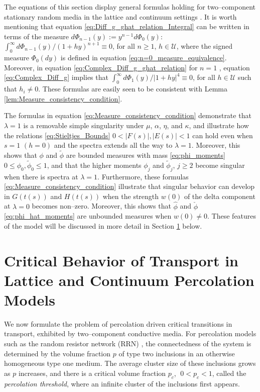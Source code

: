 \documentclass[english,12pt,jmp,graphicx]{revtex4-1}
\newcommand{\ph}{\hat{\phi}}
\begin{document}
The equations of this section display general formulas holding for
two--component stationary random media in the lattice and continuum
settings \cite{Golden:PRL-3935}. It is worth mentioning that equation
\eqref{eq:Diff_g_ghat_relation_Integral} can be written in terms of
the measure $d\Phi_{n-1}(y):=y^{n-1}d\Phi_0(y)$:
$\int_0^\infty d\Phi_{n-1}(y)/(1+hy)^{n+1}\equiv0$, for all $n\geq1$, $h\in\mathcal{U}$,
where the signed measure $\Phi_0(dy)$ is defined in equation
\eqref{eq:n=0_measure_equivalence}. Moreover, in equation 
\eqref{eq:Complex_Diff_g_ghat_relation} for $n=1$ , equation
\eqref{eq:Complex_Diff_g} implies that $\int_0^\infty d\Phi_1(y)/|1+hy|^4\equiv0$, for 
all $h\in\mathcal{U}$ such that $h_i\neq0$. These formulas
are easily seen to be consistent with Lemma
\ref{lem:Measure_consistency_condition}. 

The formulas in equation \eqref{eq:Measure_consistency_condition}
demonstrate that $\lambda=1$ is a removable simple singularity under $\mu$,
$\alpha$, $\eta$, and $\kappa$, and illustrate how the relations
\eqref{eq:Stieltjes_Bounds} $0<|F(s)|,|E(s)|<1$ can hold even when
$s=1$ $(h=0)$ and the spectra extends all the way to $\lambda=1$. Moreover,
this shows that $\phi$ and $\tilde{\phi}$ are bounded measures with mass
\eqref{eq:phi_moments} $0\leq\phi_0,\tilde{\phi}_0\leq1$, and that the higher
moments $\phi_j$ and $\tilde{\phi}_j$, $j\geq2$ become singular when there is
spectra at $\lambda=1$. Furthermore, these formulas
\eqref{eq:Measure_consistency_condition} illustrate that singular
behavior can develop in $G(t(s))$ and $H(t(s))$ when the strength
$w(0)$ of the delta component at $\lambda=0$ becomes non--zero. Moreover,
this shows that $\ph$ and $\check{\phi}$ \eqref{eq:phi_hat_moments} are
unbounded measures when $w(0)\neq0$. These features of the model will be 
discussed in more detail in Section \ref{sec:Crit_Behav_of_Transport}
below.      
%
\section{Critical Behavior of Transport in Lattice and Continuum
  Percolation Models}\label{sec:Crit_Behav_of_Transport}
%
We now formulate the problem of percolation driven critical
transitions in transport, exhibited by two--component conductive
media. For percolation models such as the random resistor network (RRN)
\cite{Stauffer-92,Torquato:RHM-02}, the connectedness of the system is
determined by the volume fraction $p$ of type two inclusions in an
otherwise homogeneous type one medium. The average cluster size of
these  inclusions grows as $p$ increases, and there is a critical
volume fraction $p_c$, $\;0<p_c<1$, called the \emph{percolation
  threshold}, where an infinite cluster of the inclusions first
appears.
\end{document}
